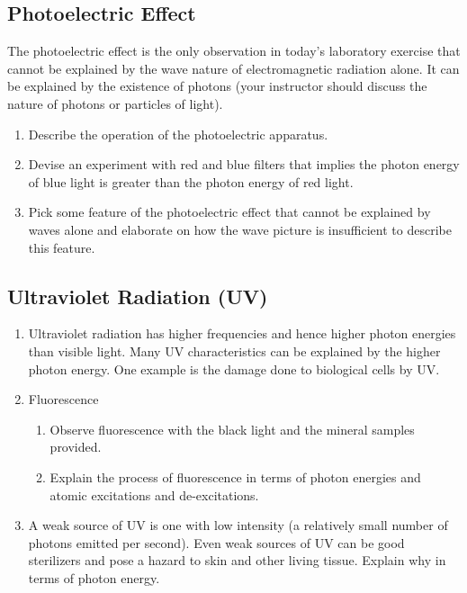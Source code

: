 \subsection {Photoelectric Effect}	
The photoelectric effect is the only observation in today's laboratory exercise that cannot be explained by the wave nature of electromagnetic radiation alone.  It can be explained by the existence of photons (your instructor should discuss the nature of photons or particles of light).
\begin{enumerate}
	\item Describe the operation of the photoelectric apparatus.
	\item Devise an experiment with red and blue filters that implies the photon energy of blue light is greater than the photon energy of red light.
	\item Pick some feature of the photoelectric effect that cannot be explained by waves alone and elaborate on how the wave picture is insufficient to describe this feature.
\end{enumerate}

	
\subsection {Ultraviolet Radiation (UV)}
\begin{enumerate}
	\item Ultraviolet radiation has higher frequencies and hence higher photon energies than visible light.  Many UV characteristics can be explained by the higher photon energy.  One example is the damage done to biological cells by UV.
	\item Fluorescence
	\begin{enumerate}
		\item Observe fluorescence with the black light and the mineral samples provided.
		\item Explain the process of fluorescence in terms of photon energies and atomic excitations and de-excitations.
	\end{enumerate}
	\item A weak source of UV is one with low intensity (a relatively small number of photons emitted per second).  Even weak sources of UV can be good sterilizers and pose a hazard to skin and other living tissue.  Explain why in terms of photon energy.
\end{enumerate}
	
